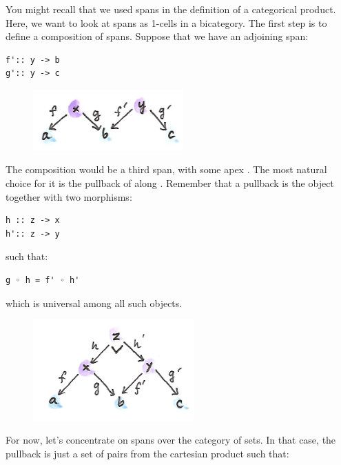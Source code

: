 \noindent
You might recall that we used spans in the definition of a categorical
product. Here, we want to look at spans as 1-cells in a bicategory. The
first step is to define a composition of spans. Suppose that we have an
adjoining span:

\begin{Verbatim}[commandchars=\\\{\}]
f':: y -> b
g':: y -> c
\end{Verbatim}

\begin{figure}[H]
\centering
\includegraphics[width=2.26042in]{images/compspan.png}
\end{figure}

\noindent
The composition would be a third span, with some apex . The
most natural choice for it is the pullback of  along
. Remember that a pullback is the object 
together with two morphisms:

\begin{Verbatim}[commandchars=\\\{\}]
h :: z -> x
h':: z -> y
\end{Verbatim}
such that:

\begin{Verbatim}[commandchars=\\\{\}]
g ◦ h = f' ◦ h'
\end{Verbatim}
which is universal among all such objects.

\begin{figure}[H]
\centering
\includegraphics[width=2.42708in]{images/pullspan.png}\\
\end{figure}

\noindent
For now, let's concentrate on spans over the category of sets. In that
case, the pullback is just a set of pairs  from the
cartesian product  such that:

